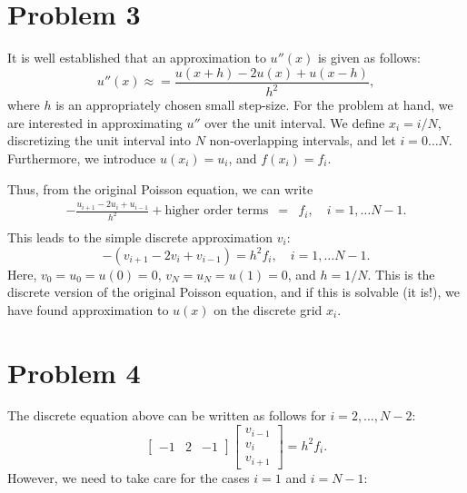 \documentclass[english,notitlepage]{revtex4}  %
\begin{document}
\section*{Problem 3}
It is well established that an approximation to $u''(x)$ is given as follows:
\begin{equation*}
    u''(x) \approx =  \frac{u(x + h) - 2 u(x) + u(x -h)}{h^2},
\end{equation*}
where $h$ is an appropriately chosen small step-size. For the problem at hand, we are interested in approximating $u''$ over the unit interval.
We define $x_i = i / N$, discretizing the unit interval into $N$ non-overlapping intervals, and let $i = 0 \ldots N$. Furthermore, we 
introduce $u(x_i) = u_i$, and $f(x_i) = f_i$.

Thus, from the original Poisson equation, we can write 
\begin{eqnarray*}
     - \frac{u_{i+1} - 2 u_i + u_{i-1}}{h^2} + \mbox{higher order terms}  & = & f_i, \quad i = 1,\ldots N-1. \\
\end{eqnarray*}
This leads to the simple discrete approximation $v_i$:
\begin{equation*}
    - (v_{i+1} - 2 v_i + v_{i-1})  = h^2 f_i, \quad i = 1,\ldots N-1. 
\end{equation*}
Here, $v_0 = u_0 = u(0) = 0$, $v_N = u_N = u(1) = 0$, and $h = 1/N$. This is the discrete version of the original Poisson equation, 
and if this is solvable (it is!), we have found approximation to $u(x)$ on the discrete grid $x_i$.
%
\section*{Problem 4}
The discrete equation above can be written as follows for $i = 2,\ldots,N-2$:
\begin{equation*}
    \begin{bmatrix}
        -1 & 2 & -1
    \end{bmatrix} 
    \begin{bmatrix}
        v_{i-1}\\v_{i}\\v_{i+1}
    \end{bmatrix}
    = h^2 f_i.
\end{equation*}
However, we need to take care for the cases $i=1$ and $i=N-1$:
\end{document}
